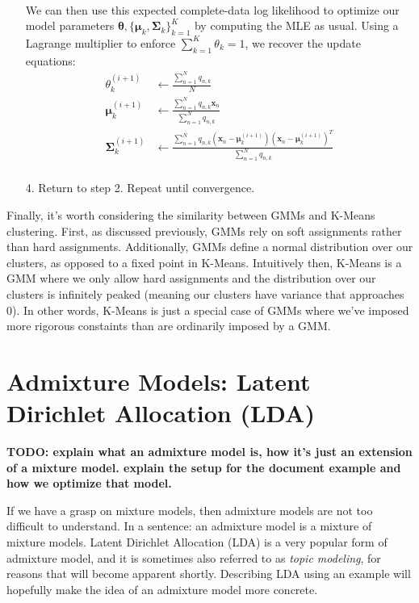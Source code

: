 \begin{itemize}
\begin{align*}
        \end{align*}
        We can then use this expected complete-data log likelihood to optimize our model parameters $\boldsymbol{\theta}, \{ \boldsymbol{\mu}_k, \boldsymbol{\Sigma}_k \}_{k=1}^{K}$ by computing the MLE as usual. Using a Lagrange multiplier to enforce $\sum_{k=1}^{K} \theta_k = 1$, we recover the update equations:
        \begin{align*}
            \theta_k^{(i + 1)} &\leftarrow \frac{\sum_{n=1}^{N} q_{n, k}}{N} \\
            \boldsymbol{\mu}_k^{(i + 1)} &\leftarrow \frac{\sum_{n=1}^{N} q_{n, k} \textbf{x}_n}{\sum_{n=1}^{N} q_{n, k}} \\
            \boldsymbol{\Sigma}_k^{(i + 1)} &\leftarrow \frac{\sum_{n=1}^{N} q_{n, k} (\textbf{x}_n - \boldsymbol{\mu}_k^{(i + 1)})(\textbf{x}_n - \boldsymbol{\mu}_k^{(i + 1)})^{T}}{\sum_{n=1}^{N} q_{n, k}} \\
        \end{align*}
    \item[4.] Return to step 2. Repeat until convergence.
\end{itemize}

Finally, it's worth considering the similarity between GMMs and K-Means clustering. First, as discussed previously, GMMs rely on soft assignments rather than hard assignments. Additionally, GMMs define a normal distribution over our clusters, as opposed to a fixed point in K-Means. Intuitively then, K-Means is a GMM where we only allow hard assignments and the distribution over our clusters is infinitely peaked (meaning our clusters have variance that approaches 0). In other words, K-Means is just a special case of GMMs where we've imposed more rigorous constaints than are ordinarily imposed by a GMM.

\section{Admixture Models: Latent Dirichlet Allocation (LDA)}
\textbf{TODO: explain what an admixture model is, how it's just an extension of a mixture model. explain the setup for the document example and how we optimize that model.}

If we have a grasp on mixture models, then admixture models are not too difficult to understand. In a sentence: an admixture model is a mixture of mixture models. Latent Dirichlet Allocation (LDA) is a very popular form of admixture model, and it is sometimes also referred to as \textit{topic modeling}, for reasons that will become apparent shortly. Describing LDA using an example will hopefully make the idea of an admixture model more concrete.

